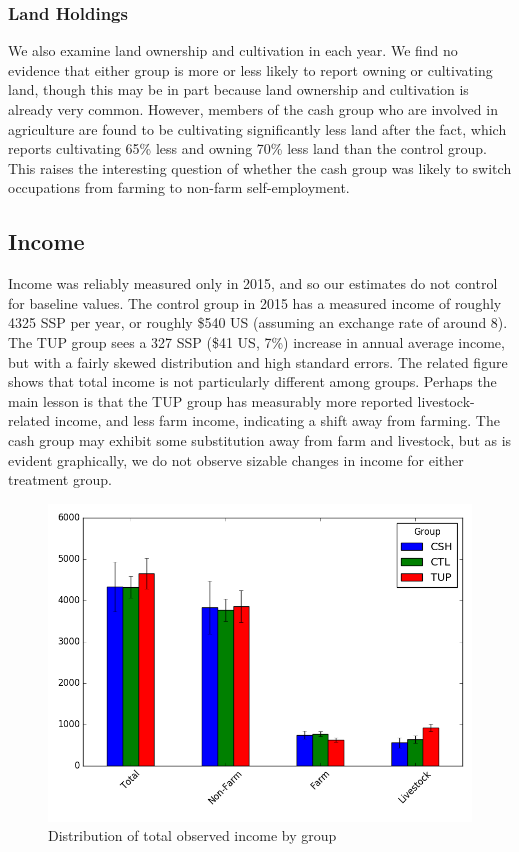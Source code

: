 \documentclass[12pt,article]{article}
\begin{document}
\subsubsection{Land Holdings}
\label{sec-3-4-3}

We also examine land ownership and cultivation in each year. We find no evidence that
either group is more or less likely to report owning or cultivating land, though this
may be in part because land ownership and cultivation is already very common.
However, members of the cash group who are involved in agriculture are found to be
cultivating significantly less land after the fact, which reports cultivating 65\%
less and owning 70\% less land than the control group. This raises the interesting
question of whether the cash group was likely to switch occupations from farming to
non-farm self-employment.

\subsection{Income}
\label{sec-3-5}

Income was reliably measured only in 2015, and so our estimates do not control for
baseline values. The control group in 2015 has a measured income of roughly 4325 SSP
per year, or roughly \$540 US (assuming an exchange rate of around 8). The TUP group
sees a 327 SSP (\$41 US, 7\%) increase in annual average income, but with a fairly
skewed distribution and high standard errors. The related figure shows that total
income is not particularly different among groups. Perhaps the main lesson is that
the TUP group has measurably more reported livestock-related income, and less farm
income, indicating a shift away from farming. The cash group may exhibit some
substitution away from farm and livestock, but as is evident graphically, we do not
observe sizable changes in income for either treatment group. 

\begin{figure}[htb]
\centering
\includegraphics[width=.9\linewidth]{../figures/Income_group.png}
\caption{\label{fig:Income_group}Distribution of total observed income by group}
\end{figure} 
\end{document}
